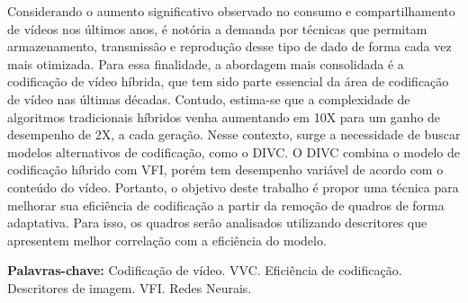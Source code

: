 \setlength{\absparsep}{18pt} %
\begin{resumo}
	\SingleSpacing
	

    Considerando o aumento significativo observado no consumo e compartilhamento de vídeos nos últimos anos, é notória a demanda por técnicas que permitam armazenamento, transmissão e reprodução desse tipo de dado de forma cada vez mais otimizada.
    Para essa finalidade, a abordagem mais consolidada é a codificação de vídeo híbrida, que tem sido parte essencial da área de codificação de vídeo nas últimas décadas.
    Contudo, estima-se que a complexidade de algoritmos tradicionais híbridos venha aumentando em 10X para um ganho de desempenho de 2X, a cada geração. 
    Nesse contexto, surge a necessidade de buscar modelos alternativos de codificação, como o \ac{DIVC}. 
    O \ac{DIVC} combina o modelo de codificação híbrido com \ac{VFI}, porém tem desempenho variável de acordo com o conteúdo do vídeo.
    Portanto, o objetivo deste trabalho é propor uma técnica para melhorar sua eficiência de codificação a partir da remoção de quadros de forma adaptativa. Para isso, os quadros serão analisados utilizando descritores que apresentem melhor correlação com a eficiência do modelo.
    
    \textbf{Palavras-chave:} Codificação de vídeo. VVC. Eficiência de codificação. Descritores de imagem. VFI. Redes Neurais.
\end{resumo}

		
